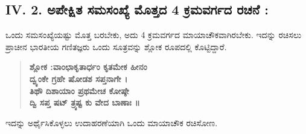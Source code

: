\subsection{IV. 2. ಅಪೇಕ್ಷಿತ ಸಮಸಂಖ್ಯೆ ಮೊತ್ತದ 4 ಕ್ರಮವರ್ಗದ ರಚನೆ :}

ಒಂದು ಸಮಸಂಖ್ಯೆಯಷ್ಟು ಮೊತ್ತ ಬರಬೇಕು, ಅದು 4 ಕ್ರಮವರ್ಗದ ಮಾಯಾಚೌಕವಾಗಿರಬೇಕು. ಇದನ್ನು ರಚಿಸಲು ಪ್ರಾಚೀನ ಭಾರತೀಯ ಗಣಿತಜ್ಞರು ಒಂದು ಸೂತ್ರವನ್ನು ಶ್ಲೋಕ ರೂಪದಲ್ಲಿ ಕೊಟ್ಟಿದ್ದಾರೆ.
\begin{quote}
\textbf{ಶ್ಲೋಕ :ವಾಂಛಾಕೃತಾರ್ಧಂ ಕೃತಮೇಕ ಹೀನಂ}\\
\textbf{ದ್ವ್ಯಂಕೇ ಗ್ರಹೇ ಷೋಡಶ ಸಪ್ತನಾಗೇ ।}\\
\textbf{ತಿಥೌ ದಿಶಾಯಾಂ ಪ್ರಥಮೇಚ ಕೋಷ್ಠೇ}\\
\textbf{ದ್ವಿ ಸಪ್ತ ಷಟ್ ತ್ರ್ಯಷ್ಟ ಕು ವೇದ ಬಾಣಾಃ ॥}
\end{quote}

ಇದನ್ನು ಅರ್ಥೈಸಿಕೊಳ್ಳಲು ಉದಾಹರಣೆಯಾಗಿ ಒಂದು ಮಾಯಾಚೌಕ ರಚಿಸೋಣ.
